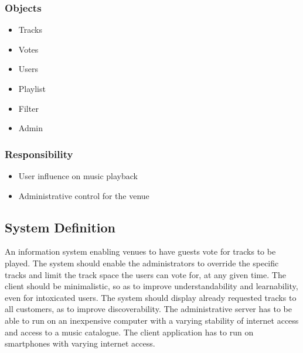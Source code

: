 \subsubsection{Objects}
\begin{itemize}
    \item Tracks
    \item Votes
    \item Users
    \item Playlist
    \item Filter
    \item Admin
\end{itemize}

\subsubsection{Responsibility}
\begin{itemize}
    \item User influence on music playback
    \item Administrative control for the venue
\end{itemize}

\subsection{System Definition}
An information system enabling venues to have guests vote for tracks to be played. The system should enable the administrators to override the specific tracks and limit the track space the users can vote for, at any given time. The client should be minimalistic, so as to improve understandability and learnability, even for intoxicated users. The system should display already requested tracks to all customers, as to improve discoverability.
The administrative server has to be able to run on an inexpensive computer with a varying stability of internet access and access to a music catalogue. The client application has to run on smartphones with varying internet access.
